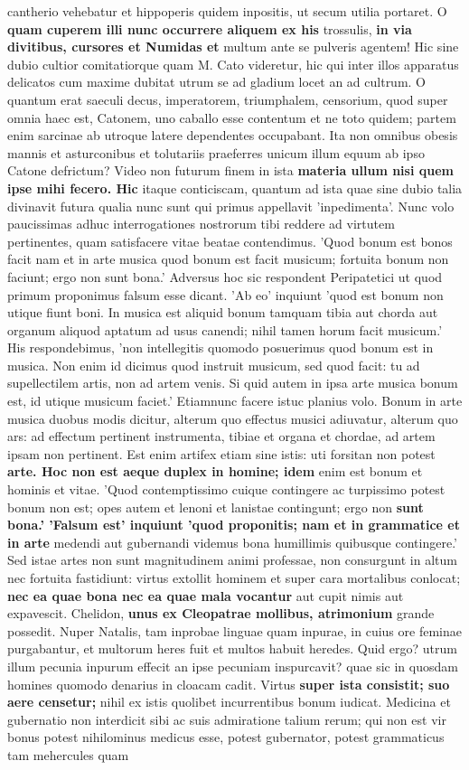 cantherio vehebatur et hippoperis quidem inpositis, ut secum utilia portaret. O \textbf{quam cuperem illi nunc occurrere aliquem ex his} trossulis, \textbf{in \textbf{via divitibus, cursores et Numidas et}} multum ante se pulveris agentem! Hic sine dubio cultior comitatiorque quam M. Cato videretur, hic qui inter illos apparatus delicatos cum maxime dubitat utrum se ad gladium locet an ad cultrum. O quantum erat saeculi decus, imperatorem, triumphalem, censorium, quod super omnia haec est, Catonem, uno caballo esse contentum et ne toto quidem; partem enim sarcinae ab utroque latere dependentes occupabant. Ita non omnibus obesis mannis et asturconibus et tolutariis praeferres unicum illum equum ab ipso Catone defrictum? Video non futurum finem in ista \textbf{materia ullum nisi quem ipse mihi fecero. Hic} itaque conticiscam, quantum ad ista quae sine dubio talia divinavit futura qualia nunc sunt qui primus appellavit 'inpedimenta'. Nunc volo paucissimas adhuc interrogationes nostrorum tibi reddere ad virtutem pertinentes, quam satisfacere vitae beatae contendimus. 'Quod bonum est bonos facit nam et in arte musica quod bonum est facit musicum; fortuita bonum non faciunt; ergo non sunt bona.' Adversus hoc sic respondent Peripatetici ut quod primum proponimus falsum esse dicant. 'Ab eo' inquiunt 'quod est bonum non utique fiunt boni. In musica est aliquid bonum tamquam tibia aut chorda aut organum aliquod aptatum ad usus canendi; nihil tamen horum facit musicum.' His respondebimus, 'non intellegitis quomodo posuerimus quod bonum est in musica. Non enim id dicimus quod instruit musicum, sed quod facit: tu ad supellectilem artis, non ad artem venis. Si quid autem in ipsa arte musica bonum est, id utique musicum faciet.' Etiamnunc facere istuc planius volo. Bonum in arte musica duobus modis dicitur, alterum quo effectus musici adiuvatur, alterum quo ars: ad effectum pertinent instrumenta, tibiae et organa et chordae, ad artem ipsam non pertinent. Est enim artifex etiam sine istis: uti forsitan non potest \textbf{arte. Hoc non est aeque duplex in homine; idem} enim est bonum et hominis et vitae. 'Quod contemptissimo cuique contingere ac turpissimo potest bonum non est; opes autem et lenoni et lanistae contingunt; ergo non \textbf{sunt bona.' 'Falsum est' inquiunt 'quod \textbf{proponitis;} nam et in grammatice et in arte} medendi aut gubernandi videmus bona humillimis quibusque contingere.' Sed istae artes non sunt magnitudinem animi professae, non consurgunt in altum nec fortuita fastidiunt: virtus extollit hominem et super cara mortalibus conlocat; \textbf{nec \textbf{ea quae bona nec ea quae mala vocantur}} aut cupit nimis aut expavescit. Chelidon, \textbf{unus ex Cleopatrae mollibus, atrimonium} grande possedit. Nuper Natalis, tam inprobae linguae quam inpurae, in cuius ore feminae purgabantur, et multorum heres fuit et multos habuit heredes. Quid ergo? utrum illum pecunia inpurum effecit an ipse pecuniam inspurcavit? quae sic in quosdam homines quomodo denarius in cloacam cadit. Virtus \textbf{super ista consistit; suo aere censetur;} nihil ex istis quolibet incurrentibus bonum iudicat. Medicina et gubernatio non interdicit sibi ac suis admiratione talium rerum; qui non est vir bonus potest nihilominus medicus esse, potest gubernator, potest grammaticus tam mehercules quam 